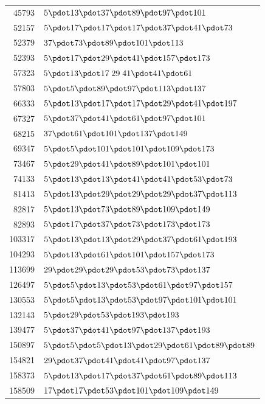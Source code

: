 %
\begingroup\small\setlength{\tabcolsep}{5pt}
\begin{longtable}{@{}r|l@{}}
45793 & $5\pdot 13\pdot 37\pdot 89\pdot 97\pdot 101$\\
52157 & $5\pdot 17\pdot 17\pdot 17\pdot 37\pdot 41\pdot 73$\\
52379 & $37\pdot 73\pdot 89\pdot 101\pdot 113$\\
52393 & $5\pdot 17\pdot 29\pdot 41\pdot 157\pdot 173$\\
57323 & $5\pdot 13\pdot 17\;29\;41\pdot 41\pdot 61$\\
57803 & $5\pdot 5\pdot 89\pdot 97\pdot 113\pdot 137$\\
66333 & $5\pdot 13\pdot 17\pdot 17\pdot 29\pdot 41\pdot 197$\\
67327 & $5\pdot 37\pdot 41\pdot 61\pdot 97\pdot 101$\\
68215 & $37\pdot 61\pdot 101\pdot 137\pdot 149$\\
69347 & $5\pdot 5\pdot 101\pdot 101\pdot 109\pdot 173$\\
73467 & $5\pdot 29\pdot 41\pdot 89\pdot 101\pdot 101$\\
74133 & $5\pdot 13\pdot 13\pdot 41\pdot 41\pdot 53\pdot 73$\\
81413 & $5\pdot 13\pdot 29\pdot 29\pdot 29\pdot 37\pdot 113$\\
82817 & $5\pdot 13\pdot 73\pdot 89\pdot 109\pdot 149$\\
82893 & $5\pdot 17\pdot 37\pdot 73\pdot 173\pdot 173$\\
103317 & $5\pdot 13\pdot 13\pdot 29\pdot 37\pdot 61\pdot 193$\\
104293 & $5\pdot 13\pdot 61\pdot 101\pdot 157\pdot 173$\\
113699 & $29\pdot 29\pdot 29\pdot 53\pdot 73\pdot 137$\\
126497 & $5\pdot 5\pdot 13\pdot 53\pdot 61\pdot 97\pdot 157$\\
130553 & $5\pdot 5\pdot 13\pdot 53\pdot 97\pdot 101\pdot 101$\\
132143 & $5\pdot 29\pdot 53\pdot 193\pdot 193$\\
139477 & $5\pdot 37\pdot 41\pdot 97\pdot 137\pdot 193$\\
150897 & $5\pdot 5\pdot 5\pdot 13\pdot 29\pdot 61\pdot 89\pdot 89$\\
154821 & $29\pdot 37\pdot 41\pdot 41\pdot 97\pdot 137$\\
158373 & $5\pdot 13\pdot 17\pdot 37\pdot 61\pdot 89\pdot 113$\\
158509 & $17\pdot 17\pdot 53\pdot 101\pdot 109\pdot 149$\\

\end{longtable}
